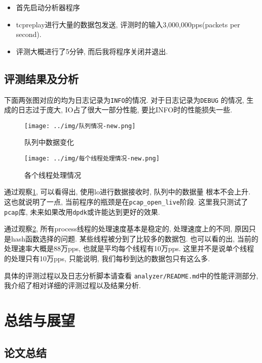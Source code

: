 \begin{itemize}
    \item 首先启动分析器程序
    \item tcpreplay进行大量的数据包发送, 评测时的输入3,000,000pps(packets per second).
    \item 评测大概进行了5分钟, 而后我将程序关闭并退出.
\end{itemize}

\section{评测结果及分析}

 下面两张图对应的均为日志记录为\texttt{INFO}的情况. 对于日志记录为\texttt{DEBUG}
的情况, 生成的日志过于庞大, IO占了很大一部分性能, 要比INFO时的性能损失一些.

\begin{figure}[htbp!]
  \centering
  \texttt{[image: ../img/队列情况-new.png]}
  \caption{队列中数据变化}
  \label{fig:queue_pic}
\end{figure}

\begin{figure}[htbp!]
  \centering
  \texttt{[image: ../img/每个线程处理情况-new.png]}
  \caption{各个线程处理情况}
  \label{fig:process_pic}
\end{figure}


通过观察\ref{fig:queue_pic}, 可以看得出, 使用lo进行数据接收时, 队列中的数据量
根本不会上升. 这也就说明了一点, 当前程序的瓶颈是在\texttt{pcap\_open\_live}阶段.
这里我只测试了\texttt{pcap}库, 未来如果改用\texttt{dpdk}或许能达到更好的效果.

通过观察\ref{fig:process_pic}, 所有process线程的处理速度基本是稳定的,
处理速度上的不同, 原因只是hash函数选择的问题. 某些线程被分到了比较多的数据包.
也可以看的出, 当前的处理速率大概是88万pps, 也就是平均每个线程有10万pps.
这里并不是说单个线程的处理只有10万pps, 只能说明, 我们每秒到达的数据包只有这么多.

具体的评测过程以及日志分析脚本请查看
\texttt{analyzer/README.md}\cite{Niftyflow}中的性能评测部分,我介绍了相对详细的评测过程以及结果分析.


\chapter{总结与展望}

\section{论文总结}

